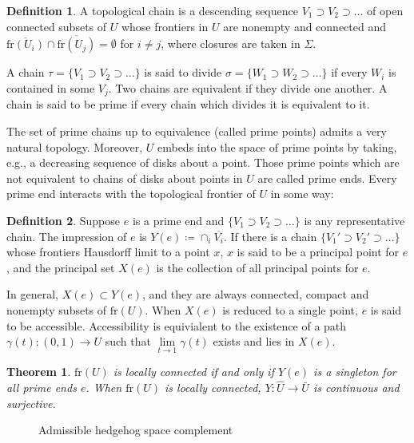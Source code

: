 \documentclass[10pt, oneside]{article}
\newcommand{\cl}[1]{\overline{#1}}
\newcommand{\fr}[1]{\text{fr}(#1)}
\newtheorem{thm}{Theorem}[section]
\theoremstyle{definition}
\newtheorem{defn}{Definition}[section]
\theoremstyle{definition}
\begin{document}
\begin{defn}
    A topological chain is a descending sequence $V_1\supset V_2\supset\dots$ of open connected subsets of $U$ whose frontiers in $U$ are nonempty and connected and $\cl{\fr{U_i}}\cap\cl{\fr{U_j}}=\emptyset$ for $i\neq j$, where closures are taken in $\Sigma$.

    A chain $\tau=\{V_1\supset V_2\supset\dots\}$ is said to divide $\sigma =\{W_1\supset W_2\supset\dots\}$ if every $W_i$ is contained in some $V_j$. Two chains are equivalent if they divide one another. A chain is said to be prime if every chain which divides it is equivalent to it.
\end{defn}

The set of prime chains up to equivalence (called prime points) admits a very natural topology. Moreover, $U$ embeds into the space of prime points by taking, e.g., a decreasing sequence of disks about a point. Those prime points which are not equivalent to chains of disks about points in $U$ are called prime ends. Every prime end interacts with the topological frontier of $U$ in some way:

\begin{defn}
    Suppose $e$ is a prime end and $\{V_1\supset V_2\supset\dots\}$ is any representative chain. The impression of $e$ is $Y(e)\coloneqq \cap_i \cl{V_i}$. If there is a chain $\{V_1'\supset V_2'\supset \dots \}$ whose frontiers Hausdorff limit to a point $x$, $x$ is said to be a principal point for $e$, and the principal set $X(e)$ is the collection of all principal points for $e$.
\end{defn}

In general, $X(e)\subset Y(e)$, and they are always connected, compact and nonempty subsets of $\fr{U}$. When $X(e)$ is reduced to a single point, $e$ is said to be accessible. Accessibility is equivialent to the existence of a path $\gamma(t):(0,1)\to U$ such that $\lim\limits_{t\to 1}\gamma(t)$ exists and lies in $X(e)$. 

\begin{thm}\label{thm:lc-fr-prime-ends}
    $\fr{U}$ is locally connected if and only if $Y(e)$ is a singleton for all prime ends $e$. When $\fr{U}$ is locally connected, $Y:\hat{U}\to \bar{U}$ is continuous and surjective.
\end{thm}


\begin{figure}
    \centering
    
    \caption{Admissible hedgehog space complement}
    \label{fig:admissible-hedgehog}
\end{figure}
\end{document}
